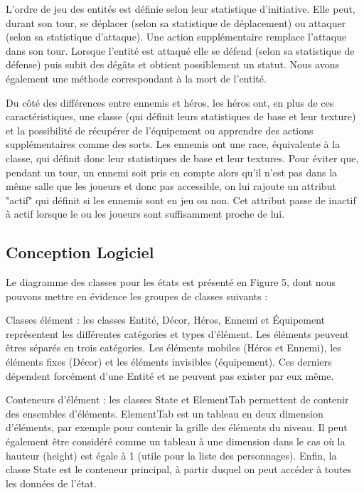 \documentclass[a4paper,12pt]{article}
\begin{document}
L'ordre de jeu des entités est définie selon leur statistique d'initiative. Elle peut, durant son tour, se déplacer (selon sa statistique de déplacement) ou attaquer (selon sa statistique d'attaque). Une action supplémentaire remplace l'attaque dans son tour. Lorsque l'entité est attaqué elle se défend (selon sa statistique de défense) puis subit des dégâts et obtient possiblement un statut. Nous avons également une méthode correspondant à la mort de l'entité.

Du côté des différences entre ennemis et héros, les héros ont, en plus de ces caractéristiques, une classe (qui définit leurs statistiques de base et leur texture) et la possibilité de récupérer de l'équipement ou apprendre des actions supplémentaires comme des sorts. Les ennemis ont une race, équivalente à la classe, qui définit donc leur statistiques de base et leur textures. Pour éviter que, pendant un tour, un ennemi soit pris en compte alors qu'il n'est pas dans la même salle que les joueurs et donc pas accessible, on lui rajoute un attribut "actif" qui définit si les ennemis sont en jeu ou non. Cet attribut passe de inactif à actif lorsque le ou les joueurs sont suffisamment proche de lui.


\subsection{Conception Logiciel}

Le diagramme des classes pour les états est présenté en Figure 5, dont nous pouvons mettre en évidence les groupes de classes suivants :

Classes élément : les classes Entité, Décor, Héros, Ennemi et Équipement représentent les différentes catégories et types d'élément. Les éléments peuvent êtres séparés en trois catégories. Les éléments mobiles (Héros et Ennemi), les éléments fixes (Décor) et les éléments invisibles (équipement). Ces derniers dépendent forcément d'une Entité et ne peuvent pas exister par eux même.  

Conteneurs d’élément :  les classes State et ElementTab permettent de contenir des ensembles d’éléments. ElementTab est un tableau en deux dimension d’éléments, par exemple pour contenir la grille des éléments du niveau. Il peut également être considéré comme un tableau à une dimension dans le cas où la hauteur (height) est égale à 1 (utile pour la liste des personnages). Enfin, la classe State est le conteneur principal, à partir duquel on peut accéder à toutes les données de l’état.
\end{document}
